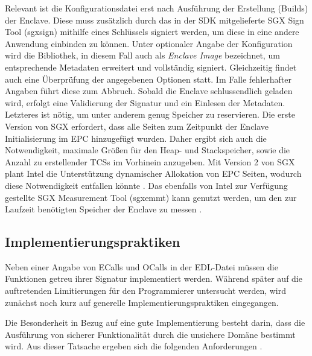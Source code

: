 Relevant ist die Konfigurationsdatei erst nach Ausführung der Erstellung (Builds) der Enclave. Diese muss zusätzlich durch das in der \ac{SDK} mitgelieferte \ac{SGX} Sign Tool (sgx\textunderscore sign) mithilfe eines Schlüssels signiert werden, um diese in eine andere Anwendung einbinden zu können. Unter optionaler Angabe der Konfiguration wird die Bibliothek, in diesem Fall auch als \textit{Enclave Image} bezeichnet, um entsprechende Metadaten erweitert und vollständig signiert. Gleichzeitig findet auch eine Überprüfung der angegebenen Optionen statt. Im Falle fehlerhafter Angaben führt diese zum Abbruch. Sobald die Enclave schlussendlich geladen wird, erfolgt eine Validierung der Signatur und ein Einlesen der Metadaten. Letzteres ist nötig, um unter anderem genug Speicher zu reservieren. Die erste Version von \ac{SGX} erfordert, dass alle Seiten zum Zeitpunkt der Enclave Initialisierung im \ac{EPC} hinzugefügt wurden. Daher ergibt sich auch die Notwendigkeit, maximale Größen für den Heap- und Stackspeicher, sowie die Anzahl zu erstellender \acp{TCS} im Vorhinein anzugeben. Mit Version 2 von \ac{SGX} plant Intel die Unterstützung dynamischer Allokation von EPC Seiten, wodurch diese Notwendigkeit entfallen könnte \cite{McKeen2016}. Das ebenfalls von Intel zur Verfügung gestellte \ac{SGX} Measurement Tool (sgx\textunderscore emmt) kann genutzt werden, um den zur Laufzeit benötigten Speicher der Enclave zu messen \cite{WinDev}.

%

\subsection{Implementierungspraktiken}

Neben einer Angabe von \acp{ECall} und \acp{OCall} in der \ac{EDL}-Datei müssen die Funktionen getreu ihrer Signatur implementiert werden. Während später auf die auftretenden Limitierungen für den Programmierer untersucht werden, wird zunächst noch kurz auf generelle Implementierungspraktiken eingegangen. 

Die Besonderheit in Bezug auf eine gute Implementierung besteht darin, dass die Ausführung von sicherer Funktionalität durch die unsichere Domäne bestimmt wird. Aus dieser Tatsache ergeben sich die folgenden Anforderungen \cite{WinGuide}.

